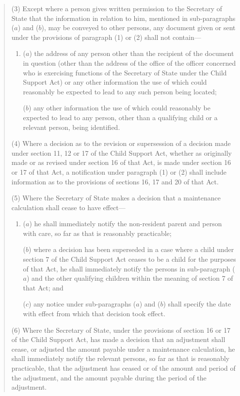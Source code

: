 \documentclass[12pt,a4paper]{article}
\begin{document}
\begin{quotation}
(3) Except where a person gives written permission to the Secretary of State that the information in relation to him, mentioned in sub-paragraphs ($a$)  and ($b$), may be conveyed to other persons, any document given or sent under the provisions of paragraph (1) or (2) shall not contain—
\begin{enumerate}\item[]
($a$) the address of any person other than the recipient of the document in question (other than the address of the office of the officer concerned who is exercising functions of the Secretary of State under the Child Support Act) or any other information the use of which could reasonably be expected to lead to any such person being located;

($b$) any other information the use of which could reasonably be expected to lead to any person, other than a qualifying child or a relevant person, being identified.
\end{enumerate}

(4) Where a decision as to the revision or supersession of a decision made under section 11, 12 or 17 of the Child Support Act, whether as originally made or as revised under section 16 of that Act, is made under section 16 or 17 of that Act, a notification under paragraph (1) or (2) shall include information as to the provisions of sections 16, 17 and 20 of that Act.

(5) Where the Secretary of State makes a decision that a maintenance calculation shall cease to have effect—
\begin{enumerate}\item[]
($a$) he shall immediately notify the non-resident parent and person with care, so far as that is reasonably practicable;

($b$) where a decision has been superseded in a case where a child under section 7 of the Child Support Act ceases to be a child for the purposes of that Act, he shall immediately notify the persons in sub-paragraph ($a$)  and the other qualifying children within the meaning of section 7 of that Act; and

($c$) any notice under sub-paragraphs ($a$)  and ($b$)  shall specify the date with effect from which that decision took effect.
\end{enumerate}

(6) Where the Secretary of State, under the provisions of section 16 or 17 of the Child Support Act, has made a decision that an adjustment shall cease, or adjusted the amount payable under a maintenance calculation, he shall immediately notify the relevant persons, so far as that is reasonably practicable, that the adjustment has ceased or of the amount and period of the adjustment, and the amount payable during the period of the adjustment.


\end{quotation}
\end{document}

